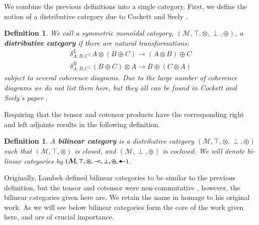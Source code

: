 \documentclass{lmcs}
\newtheorem{definition}[theorem]{Definition}
\let\mto\to
\let\to\relax
\newcommand{\to}{\rightarrow}
\newcommand{\cat}[1]{\mathcal{#1}}
\newcommand{\limp}[0]{\multimap}
\newcommand{\colimp}[0]{\multimapdotinv}
\begin{document}
We combine the previous definitions into a single category.  First, we
define the notion of a distributive category due to Cockett and Seely
\cite{Cockett:1997}.
\begin{definition}
  \label{def:dist-cat}
  We call a symmetric monoidal category, $(\cat{M}, \top, \otimes,
  \perp, \oplus)$, a \textbf{distributive category} if there are
  natural transformations:
  \[
  \begin{array}{lll}
    \delta^L_{A,B,C} : A \otimes (B \oplus C) \mto (A \otimes B) \oplus C\\
    \delta^R_{A,B,C} : (B \oplus C) \otimes A \mto B \oplus (C \otimes A)
  \end{array}
  \]
  subject to several coherence diagrams.  Due to the large number of
  coherence diagrams we do not list them here, but they all can be
  found in Cockett and Seely's paper \cite{Cockett:1997}.
\end{definition}
\noindent
Requiring that the tensor and cotensor products have the corresponding
right and left adjoints results in the following definition.
\begin{definition}
  \label{def:bilinear-cat}
  A \textbf{bilinear category} is a distributive category $(\cat{M},
  \top, \otimes, \perp, \oplus)$ such that $(\cat{M}, \top, \otimes)$
  is closed, and $(\cat{M}, \perp, \oplus)$ is coclosed.  We will
  denote bi-linear categories by $(\cat{M}, \top, \otimes, \limp, \perp,
  \oplus, \colimp)$.
\end{definition}
Originally, Lambek defined bilinear categories to be similar to the
previous definition, but the tensor and cotensor were non-commutative
\cite{Cockett:1997a}, however, the bilinear categories given here
are. We retain the name in homage to his original work.  As we will
see below bilinear categories form the core of the work given here,
and are of crucial importance.
\end{document}
